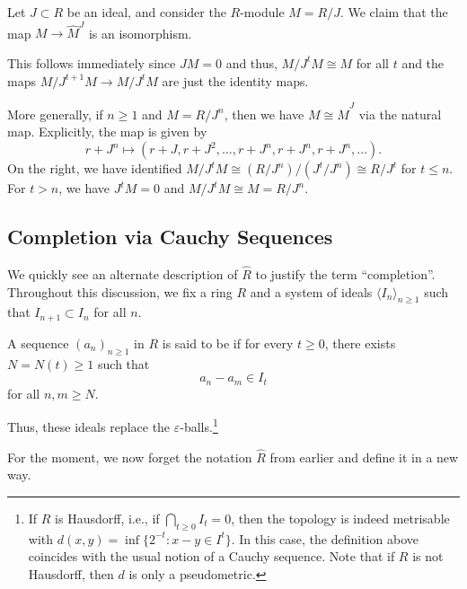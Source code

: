 \documentclass[12pt]{article}
\begin{document}
\begin{ex} \label{ex:J-adic-completion-R-mod-J}
	Let $J \subset R$ be an ideal, and consider the $R$-module $M = R/J$. We claim that the map $M \to \widehat{M}^{J}$ is an isomorphism.

	This follows immediately since $JM = 0$ and thus, $M/J^{t} M \cong M$ for all $t$ and the maps $M/J^{t + 1} M \to M/J^{t} M$ are just the identity maps. 

	More generally, if $n \ge 1$ and $M = R/J^{n}$, then we have $M \cong \widehat{M}^{J}$ via the natural map. Explicitly, the map is given by
	\begin{equation*} 
		r + J^{n} \mapsto (r + J, r + J^{2}, \ldots, r + J^{n}, r + J^{n}, r + J^{n}, \ldots).
	\end{equation*}
	On the right, we have identified $M/J^{t} M \cong (R/J^{n})/(J^{t}/J^{n}) \cong R/J^{t}$ for $t \le n$. For $t > n$, we have $J^{t} M = 0$ and $M/J^{t} M \cong M = R/J^{n}$.
\end{ex}

\subsection{Completion via Cauchy Sequences}

We quickly see an alternate description of $\widehat{R}$ to justify the term ``completion''. Throughout this discussion, we fix a ring $R$ and a system of ideals $\langle I_{n} \rangle_{n \ge 1}$ such that $I_{n + 1} \subset I_{n}$ for all $n$. %

\begin{defn}
	A sequence $(a_{n})_{n \ge 1}$ in $R$ is said to be  if for every $t \ge 0$, there exists $N = N(t) \ge 1$ such that
	\begin{equation*} 
		a_{n} - a_{m} \in I_{t}
	\end{equation*}
	for all $n, m \ge N$.
\end{defn}

Thus, these ideals replace the $\varepsilon$-balls.\footnote{If $R$ is Hausdorff, i.e., if $\bigcap_{t \ge 0} I_{t} = 0$, then the topology is indeed metrisable with $d(x, y) = \inf\{2^{-t} : x - y \in I^{t}\}$. In this case, the definition above coincides with the usual notion of a Cauchy sequence. Note that if $R$ is not Hausdorff, then $d$ is only a pseudometric.}

For the moment, we now forget the notation $\widehat{R}$ from earlier and define it in a new way.
\end{document}
